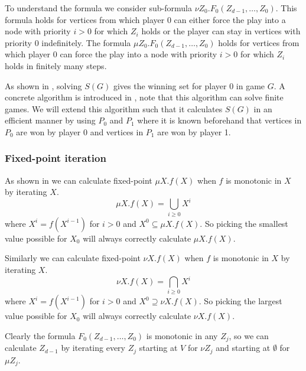 To understand the formula we consider sub-formula $\nu Z_0. F_0(Z_{d-1},\dots,Z_0)$. This formula holds for vertices from which player $0$ can either force the play into a node with priority $i > 0$ for which $Z_i$ holds or the player can stay in vertices with priority $0$ indefinitely. The formula $\mu Z_0. F_0(Z_{d-1},\dots,Z_0)$ holds for vertices from which player $0$ can force the play into a node with priority $i > 0$ for which $Z_i$ holds in finitely many steps.

As shown in \cite{WALUKIEWICZ2002311}, solving $S(G)$ gives the winning set for player $0$ in game $G$. A concrete algorithm is introduced in \cite{FPITE}, note that this algorithm can solve finite games. We will extend this algorithm such that it calculates $S(G)$ in an efficient manner by using $P_0$ and $P_1$ where it is known beforehand that vertices in $P_0$ are won by player 0 and vertices in $P_1$ are won by player 1. 

\subsubsection{Fixed-point iteration}
As shown in \cite{Emerson:1986:MCP:900378} we can calculate fixed-point $\mu X.f(X)$ when $f$ is monotonic in $X$ by iterating $X$.
\[ \mu X.f(X) = \bigcup_{i \geq 0} X^i \]
where $X^i = f(X^{i-1})$ for $i > 0$ and $X^0 \subseteq \mu X.f(X)$. So picking the smallest value possible for $X_0$ will always correctly calculate $\mu X. f(X)$.

Similarly we can calculate fixed-point $\nu X.f(X)$ when $f$ is monotonic in $X$ by iterating $X$.
\[ \nu X.f(X) = \bigcap_{i \geq 0} X^i \]
where $X^i = f(X^{i-1})$ for $i > 0$ and $X^0 \supseteq \nu X.f(X)$. So picking the largest value possible for $X_0$ will always correctly calculate $\nu X. f(X)$.

Clearly the formula $F_0(Z_{d-1},\dots,Z_0)$ is monotonic in any $Z_j$, so we can calculate $Z_{d-1}$ by iterating every $Z_j$ starting at $V$ for $\nu Z_j$ and starting at $\emptyset$ for $\mu Z_j$.

